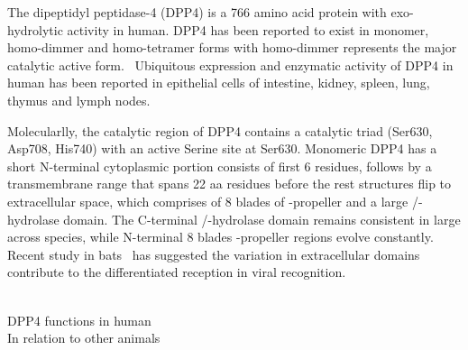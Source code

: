 The dipeptidyl peptidase-4 (DPP4) is a 766 amino acid protein with exo-hydrolytic activity in human. DPP4 has been reported to exist in  monomer, homo-dimmer and homo-tetramer forms  with homo-dimmer represents the major catalytic active form.~\cite{Mulvihill_2014} Ubiquitous expression and enzymatic activity of DPP4 in human has been reported in epithelial cells of intestine, kidney, spleen, lung, thymus and lymph nodes. 

Molecularlly, the catalytic region of DPP4 contains a catalytic triad (Ser630, Asp708, His740) with an active Serine site at Ser630. Monomeric DPP4 has a short N-terminal cytoplasmic portion consists of first 6 residues, follows by a transmembrane range that spans 22 aa residues before the rest structures flip to extracellular space, which comprises of 8 blades of \beta-propeller and a large \alpha/\beta-hydrolase domain. The C-terminal \alpha/\beta-hydrolase domain remains consistent in large across species, while N-terminal 8 blades \beta-propeller regions evolve constantly. Recent study in bats~\cite{Letko_2018}\cite{Cui_2013} has suggested the variation in extracellular domains contribute to the differentiated reception in viral recognition.  

\\
DPP4 functions in human 
\\ 
In relation to other animals 

